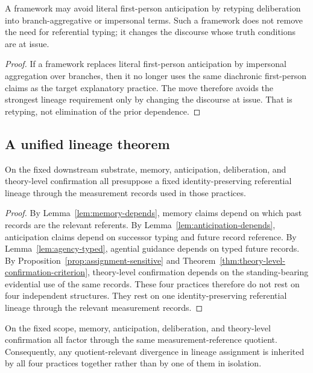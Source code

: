 \begin{proposition}
\label{prop:branch-aggregative-retyping}
A framework may avoid literal first-person anticipation by retyping deliberation into branch-aggregative
or impersonal terms. Such a framework does not remove the need for referential typing; it changes the
discourse whose truth conditions are at issue.
\end{proposition}

\begin{proof}
If a framework replaces literal first-person anticipation by impersonal aggregation over branches, then
it no longer uses the same diachronic first-person claims as the target explanatory practice. The move
therefore avoids the strongest lineage requirement only by changing the discourse at issue. That is
retyping, not elimination of the prior dependence.
\end{proof}

\subsection{A unified lineage theorem}

\begin{theorem}
\label{thm:identity-preserving-lineage}
On the fixed downstream substrate, memory, anticipation, deliberation, and theory-level confirmation
all presuppose a fixed identity-preserving referential lineage through the measurement records used in
those practices.
\end{theorem}

\begin{proof}
By Lemma~\ref{lem:memory-depends}, memory claims depend on which past records are the relevant
referents. By Lemma~\ref{lem:anticipation-depends}, anticipation claims depend on successor typing
and future record reference. By Lemma~\ref{lem:agency-typed}, agential guidance depends on typed
future records. By Proposition~\ref{prop:assignment-sensitive} and
Theorem~\ref{thm:theory-level-confirmation-criterion}, theory-level confirmation depends on the
standing-bearing evidential use of the same records. These four practices therefore do not rest on four
independent structures. They rest on one identity-preserving referential lineage through the relevant
measurement records.
\end{proof}

\begin{theorem}
\label{thm:diachronic-inheritance}
On the fixed scope, memory, anticipation, deliberation, and theory-level confirmation all factor
through the same measurement-reference quotient. Consequently, any quotient-relevant divergence in
lineage assignment is inherited by all four practices together rather than by one of them in isolation.
\end{theorem}


